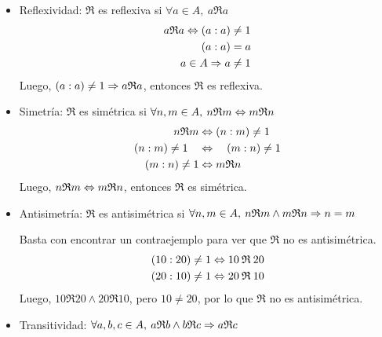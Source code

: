 \documentclass[a4paper,spanish]{article}
\begin{document}
  \begin{itemize}
    \item Reflexividad: $\mathfrak{R}$ es reflexiva si 
    $\forall a \in A,\> a\mathfrak{R}a$
    \begin{align*}
      a\mathfrak{R}a \Leftrightarrow (a:a) &\neq 1 \\
      (a:a) &= a \\
      a \in A \Rightarrow a &\neq 1
    \end{align*}
    Luego, $(a:a) \neq 1 \Rightarrow a\mathfrak{R}a$, 
    entonces $\mathfrak{R}$ es reflexiva.

    \item Simetría: $\mathfrak{R}$ es simétrica si 
    $\forall n,m \in A,\> n\mathfrak{R}m \Leftrightarrow m\mathfrak{R}n$
    \begin{align*}
      n\mathfrak{R}m      &\Leftrightarrow (n:m) \neq 1\\
      (n:m) \neq 1 \quad  &\Leftrightarrow \quad (m:n) \neq 1 \\
      (m:n) \neq 1        &\Leftrightarrow m\mathfrak{R}n
    \end{align*}
    Luego, $n\mathfrak{R}m \Leftrightarrow m\mathfrak{R}n$,
    entonces $\mathfrak{R}$ es simétrica.

    \item Antisimetría: $\mathfrak{R}$ es antisimétrica si $\forall n,m \in A,\> 
    n\mathfrak{R}m \land m\mathfrak{R}n \Rightarrow n=m$

    Basta con encontrar un contraejemplo para ver que $\mathfrak{R}$ 
    no es antisimétrica.
    \begin{align*}
      (10:20) \neq 1 \Leftrightarrow 10\>\mathfrak{R}\>20 \\
      (20:10) \neq 1 \Leftrightarrow 20\>\mathfrak{R}\>10
    \end{align*}
    Luego, $10\mathfrak{R}20 \land 20\mathfrak{R}10$, pero $10 \neq 20$, 
    por lo que $\mathfrak{R}$ no es antisimétrica.

    \item Transitividad: $\forall a,b,c \in A,\>
    a\mathfrak{R}b \land b\mathfrak{R}c \Rightarrow a\mathfrak{R}c$


\end{itemize}
\end{document}
